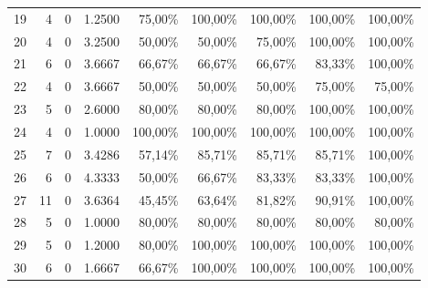 \begin{table}[htbp]
{\begin{tabular}{r r r r r r r r r}
19 & 4 & 0 & 1.2500 & 75,00\% & 100,00\% & 100,00\% & 100,00\% & 100,00\% \\
20 & 4 & 0 & 3.2500 & 50,00\% & 50,00\% & 75,00\% & 100,00\% & 100,00\% \\
21 & 6 & 0 & 3.6667 & 66,67\% & 66,67\% & 66,67\% & 83,33\% & 100,00\% \\
22 & 4 & 0 & 3.6667 & 50,00\% & 50,00\% & 50,00\% & 75,00\% & 75,00\% \\
23 & 5 & 0 & 2.6000 & 80,00\% & 80,00\% & 80,00\% & 100,00\% & 100,00\% \\
24 & 4 & 0 & 1.0000 & 100,00\% & 100,00\% & 100,00\% & 100,00\% & 100,00\% \\
25 & 7 & 0 & 3.4286 & 57,14\% & 85,71\% & 85,71\% & 85,71\% & 100,00\% \\
26 & 6 & 0 & 4.3333 & 50,00\% & 66,67\% & 83,33\% & 83,33\% & 100,00\% \\
27 & 11 & 0 & 3.6364 & 45,45\% & 63,64\% & 81,82\% & 90,91\% & 100,00\% \\
28 & 5 & 0 & 1.0000 & 80,00\% & 80,00\% & 80,00\% & 80,00\% & 80,00\% \\
29 & 5 & 0 & 1.2000 & 80,00\% & 100,00\% & 100,00\% & 100,00\% & 100,00\% \\
30 & 6 & 0 & 1.6667 & 66,67\% & 100,00\% & 100,00\% & 100,00\% & 100,00\% \\
\bottomrule
\end{tabular}
}
\end{table}

